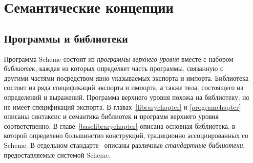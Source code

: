 \chapter{Семантические концепции}
\label{basicchapter}

\section{Программы и библиотеки}\vspace{-1mm}

Программа Scheme состоит из \textit{программы верхнего уровня} вместе с
набором \textit{библиотек}, каждая из которых определяет часть программы, связанную
с другими частями посредством явно указываемых экспорта и импорта. Библиотека состоит из ряда
спецификаций экспорта и импорта, а также тела, состоящего из определений и выражений. Программа
верхнего уровня похожа на библиотеку, но не имеет спецификаций
экспорта. В главах~\ref{librarychapter} и \ref{programchapter} описаны синтаксис и семантика
библиотек и программ верхнего уровня соответственно. В главе~\ref{baselibrarychapter} описана
основная библиотека, в которой определено большинство конструкций, традиционно ассоциированных со
Scheme. В отдельном стандарте~\cite{R6RS-libraries} описаны различные \textit{стандартные
библиотеки},  предоставляемые системой Scheme.

